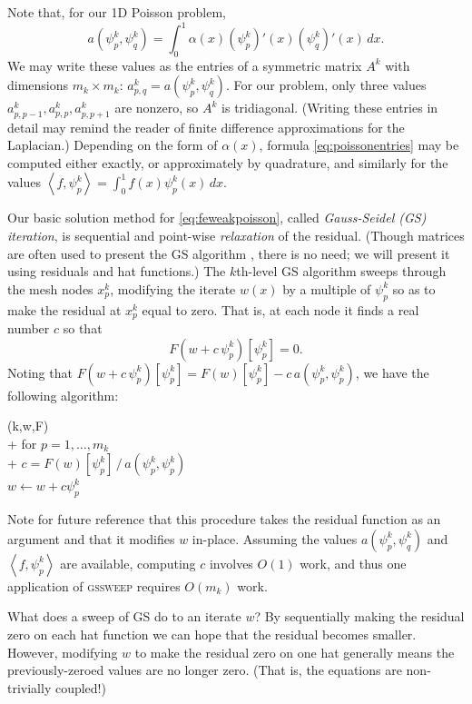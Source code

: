 \documentclass[letterpaper,final,12pt,reqno]{amsart}
\theoremstyle{claim}
\newcommand{\ip}[2]{\left<#1,#2\right>}
\numberwithin{equation}{section}
\numberwithin{figure}{section}
\numberwithin{table}{section}
\begin{document}
Note that, for our 1D Poisson problem,
\begin{equation}
  a(\psi_p^k,\psi_q^k) = \int_0^1 \alpha(x) (\psi_p^k)'(x) (\psi_q^k)'(x)\,dx. \label{eq:poissonentries}
\end{equation}
We may write these values as the entries of a symmetric matrix $A^k$ with dimensions $m_k\times m_k$: $a_{p,q}^k = a(\psi_p^k,\psi_q^k)$.  For our problem, only three values $a_{p,p-1}^k, a_{p,p}^k, a_{p,p+1}^k$ are nonzero, so $A^k$ is tridiagonal.  (Writing these entries in detail may remind the reader of finite difference approximations for the Laplacian.)  Depending on the form of $\alpha(x)$, formula \eqref{eq:poissonentries} may be computed either exactly, or approximately by quadrature, and similarly for the values $\ip{f}{\psi_p^k} = \int_0^1 f(x) \psi_p^k(x)\,dx$.

Our basic solution method for \eqref{eq:feweakpoisson}, called \emph{Gauss-Seidel (GS) iteration}, is sequential and point-wise \emph{relaxation} of the residual.  (Though matrices are often used to present the GS algorithm \cite[for example]{Bueler2021,Greenbaum1997}, there is no need; we will present it using residuals and hat functions.)  The $k$th-level GS algorithm sweeps through the mesh nodes $x_p^k$, modifying the iterate $w(x)$ by a multiple of $\psi_p^k$ so as to make the residual at $x_p^k$ equal to zero.  That is, at each node it finds a real number $c$ so that
\begin{equation}
  F(w+c\,\psi_p^k)[\psi_p^k] = 0.  \label{eq:gaussseidelpoint}
\end{equation}
Noting that $F(w+c\,\psi_p^k)[\psi_p^k] = F(w)[\psi_p^k] - c\, a(\psi_p^k,\psi_p^k)$, we have the following algorithm:
\begin{pseudo*}
(k,w,F)\text{:} \\+
    for $p=1,\dots,m_k$ \\+
        $\displaystyle c = F(w)[\psi_p^k]\, \big/ \,a(\psi_p^k,\psi_p^k)$  \\
        $w \gets w + c \psi_p^k$
\end{pseudo*}
Note for future reference that this procedure takes the residual function as an argument and that it modifies $w$ in-place.  Assuming the values $a(\psi_p^k,\psi_q^k)$ and $\ip{f}{\psi_p^k}$ are available, computing $c$ involves $O(1)$ work, and thus one application of \textsc{gssweep} requires $O(m_k)$ work.

What does a sweep of GS do to an iterate $w$?  By sequentially making the residual zero on each hat function we can hope that the residual becomes smaller.  However, modifying $w$ to make the residual zero on one hat generally means the previously-zeroed values are no longer zero.  (That is, the equations are non-trivially coupled!)
\end{document}
